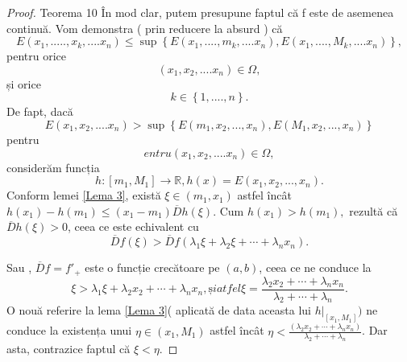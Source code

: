\documentclass[a4paper,12pt,oneside]{report}
\begin{document}
\begin{proof} Teorema 10
În mod clar, putem presupune faptul că f este de asemenea continuă. Vom demonstra ( prin reducere la absurd ) că
\begin{displaymath}
  E \left ( x_{1},....., x_{k},....x_{n} \right ) \leq  \sup \left \{ E\left ( x_{1},....,m_{k},....x_{n} \right ),E\left ( x_{1},....,M_{k},....x_{n} \right ) \right \},
\end{displaymath}
 pentru orice
\begin{displaymath}
     \left ( x_{1}, x_{2},....x_{n} \right ) \in\Omega, 
\end{displaymath}
și orice
\begin{displaymath}
    k \in\left \{ 1,....,n \right \}. 
\end{displaymath}
 De fapt, dacă
\begin{displaymath}
   E  \left ( x_{1}, x_{2},....x_{n} \right )  >  \sup \left \{ E\left ( m_{1}, x_{2} ,..., x_{n}\right ), E\left ( M_{1}, x_{2} ,..., x_{n}\right )  \right \}  
\end{displaymath}
pentru
\begin{displaymath}
  entru \left ( x_{1}, x_{2},....x_{n} \right ) \in \Omega,
\end{displaymath}
considerăm funcția 
\begin{displaymath}
  h : \left [ m_{1}, M_{1} \right ] \rightarrow \mathbb{R}, h\left ( x \right ) = E\left ( x_{1}, x_{2},...,x_{n} \right ). 
\end{displaymath}
Conform lemei \ref{Lema 3}, există \(\xi \in \left ( m_{1}, x_{1} \right )\) astfel încât \(h \left ( x_{1} \right ) - h\left ( m_{1} \right ) \leq  \left ( x_{1} - m_{1} \right )\overline{D}h\left ( \xi  \right ).\) 
Cum \(h \left ( x_{1} \right ) >  h\left ( m_{1} \right ),\) rezultă că \(\overline{D}h\left ( \xi  \right ) > 0\), ceea ce este echivalent cu 
\begin{displaymath}
   \overline{D}f\left ( \xi  \right ) > \overline{D}f\left (\lambda _{1}\xi +\lambda _{2}\xi +\cdots +\lambda _{n} x_{n} \right ). 
\end{displaymath}

Sau , \(\overline{D}f = {f}'_{+}\) este o funcție crecătoare pe \(\left ( a,b \right )\), ceea ce ne conduce la 
\begin{displaymath}
   \xi > \lambda _{1}\xi +\lambda _{2}x_{2} + \cdots +\lambda _{n}x_{n},
și atfel \xi = \frac{\lambda _{2}x_{2} + \cdots +\lambda _{n}x_{n}}{\lambda _{2}+\cdots +\lambda _{n}}.
\end{displaymath}
O nouă referire la lema \ref{Lema 3}( aplicată de data aceasta lui \(h|_{\left [ x_{1},M_{1} \right ]})\) ne conduce la existența unui \(\eta \in \left ( x_{1} , M_{1}\right )\) astfel încât \(\eta < \frac{\left ( \lambda _{2}x_{2}+\cdots +\lambda _{n}x_{n} \right )}{\lambda _{2}+\cdots +\lambda _{n}}\). Dar asta, contrazice faptul că \(\xi <  \eta \). 
\end{proof}
\end{document}
